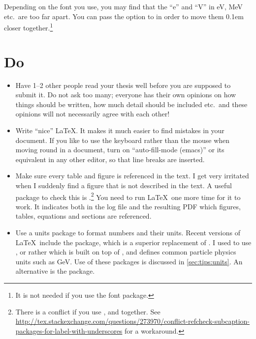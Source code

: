 Depending on the font you use, you may find that the \enquote{e} and \enquote{V} in \unit{\eV}, \unit{\MeV} etc.\
are too far apart.
You can pass the option  to  in order to move them 0.1em closer together.\footnote{%
It is not needed if you use the \Package{newtx} font package.}


\section{Do}%
\label{sec:tips:do}

\begin{itemize}
\item Have 1--2 other people read your thesis well before you are
  supposed to submit it. Do not ask too many; everyone has their own
  opinions on how things should be written, how much detail should be
  included etc.\ and these opinions will not necessarily agree with
  each other!

\item Write \enquote{nice} \LaTeX. It makes it much easier to find mistakes
  in your document. If you like to use the keyboard rather than the
  mouse when moving round in a document, turn on \enquote{auto-fill-mode
  (emacs)}\index{emacs} or its equivalent in any other editor, so
  that line breaks are inserted.

\item Make sure every table and figure is referenced in the text. I
  get very irritated when I suddenly find a figure that is not
  described in the text. A useful package to check this is
  .\footnote{%
  There is a conflict if you use ,  and  together.
  See \url{http://tex.stackexchange.com/questions/273970/conflict-refcheck-subcaption-packages-for-label-with-underscores} for a workaround.}
  You need to run \LaTeX\ one more time for it to work.
  It indicates both in the log file and the resulting PDF which
  figures, tables, equations and sections are referenced.

\item Use a units package to format numbers and their units. Recent
  versions of \LaTeX\ include the \PackageG{siunitx} package, which
  is a superior replacement of . I used to
  use , or rather  which is
  built on top of \Package{SIunits}, and defines common particle
  physics units such as \unit{\GeV}. Use of these packages is
  discussed in \cref{sec:tips:units}.
  An alternative is the  package.


\end{itemize}

